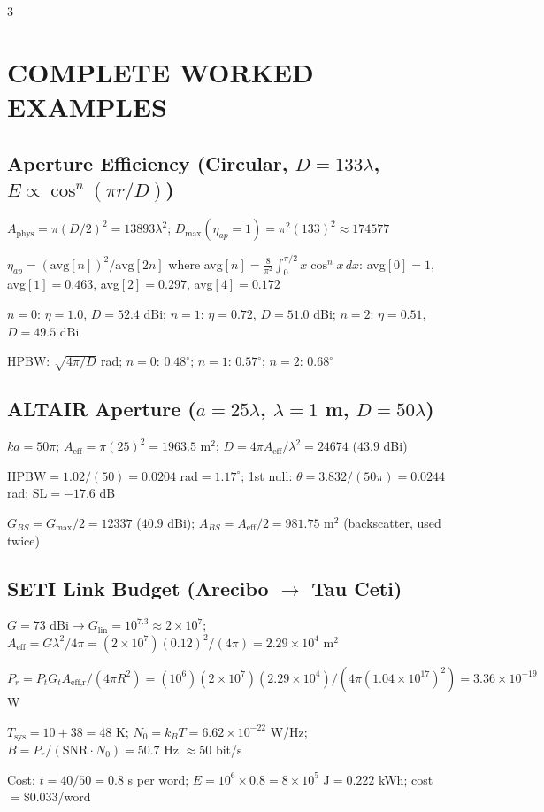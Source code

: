 \documentclass[6pt,landscape]{article}
\begin{document}
\begin{multicols}{3}
\section*{COMPLETE WORKED EXAMPLES}

\subsection*{Aperture Efficiency (Circular, $D=133\lambda$, $E\propto\cos^n(\pi r/D)$)}
$A_\text{phys}=\pi(D/2)^2=13893\lambda^2$; $D_\text{max}(\eta_{ap}=1)=\pi^2(133)^2\approx174577$

$\eta_{ap}=(\text{avg}[n])^2/\text{avg}[2n]$ where avg$[n]=\frac{8}{\pi^2}\int_0^{\pi/2}x\cos^n x\,dx$: avg$[0]=1$, avg$[1]=0.463$, avg$[2]=0.297$, avg$[4]=0.172$

$n=0$: $\eta=1.0$, $D=52.4$ dBi; $n=1$: $\eta=0.72$, $D=51.0$ dBi; $n=2$: $\eta=0.51$, $D=49.5$ dBi

HPBW: $\sqrt{4\pi/D}$ rad; $n=0$: $0.48^\circ$; $n=1$: $0.57^\circ$; $n=2$: $0.68^\circ$

\subsection*{ALTAIR Aperture ($a=25\lambda$, $\lambda=1$ m, $D=50\lambda$)}
$k a=50\pi$; $A_\text{eff}=\pi(25)^2=1963.5$ m$^2$; $D=4\pi A_\text{eff}/\lambda^2=24674$ ($43.9$ dBi)

HPBW$=1.02/(50)=0.0204$ rad$=1.17^\circ$; 1st null: $\theta=3.832/(50\pi)=0.0244$ rad; SL$=-17.6$ dB

$G_{BS}=G_\text{max}/2=12337$ ($40.9$ dBi); $A_{BS}=A_\text{eff}/2=981.75$ m$^2$ (backscatter, used twice)

\subsection*{SETI Link Budget (Arecibo $\to$ Tau Ceti)}
$G=73$ dBi$\to G_\text{lin}=10^{7.3}\approx2\times10^7$; $A_\text{eff}=G\lambda^2/4\pi=(2\times10^7)(0.12)^2/(4\pi)=2.29\times10^4$ m$^2$

$P_r=P_t G_t A_\text{eff,r}/(4\pi R^2)=(10^6)(2\times10^7)(2.29\times10^4)/(4\pi(1.04\times10^{17})^2)=3.36\times10^{-19}$ W

$T_\text{sys}=10+38=48$ K; $N_0=k_B T=6.62\times10^{-22}$ W/Hz; $B=P_r/(\text{SNR}\cdot N_0)=50.7$ Hz $\approx50$ bit/s

Cost: $t=40/50=0.8$ s per word; $E=10^6\times0.8=8\times10^5$ J$=0.222$ kWh; cost$=\$0.033$/word


\end{multicols}
\end{document}
